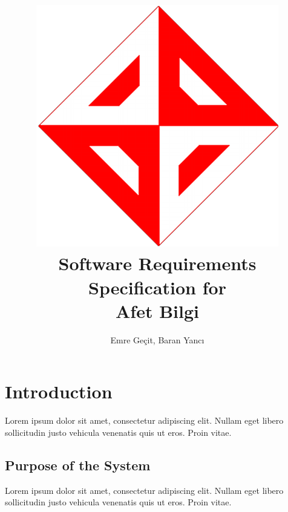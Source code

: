 \documentclass[a4paper]{article}
\author{Emre Geçit, Baran Yancı}
\begin{document}
    \title{\includegraphics[scale=0.2]{assets/ceng_400x400.png}\\ Software Requirements Specification for \\  \textbf{Afet Bilgi}}
    \maketitle

    \newpage
    \makeatletter
	\renewcommand\tableofcontents{%
		\null\hfill\textbf{\Large\contentsname}\hfill\null\par
		\@mkboth{\MakeUppercase\contentsname}{\MakeUppercase\contentsname}%
	}
	\makeatother

    \tableofcontents
    \doublespacing

    \newpage

    \section{Introduction}

        Lorem ipsum dolor sit amet, consectetur adipiscing elit. Nullam eget libero sollicitudin justo vehicula venenatis quis ut eros. Proin vitae.

        \subsection{Purpose of the System}

        Lorem ipsum dolor sit amet, consectetur adipiscing elit. Nullam eget libero sollicitudin justo vehicula venenatis quis ut eros. Proin vitae.
\end{document}

